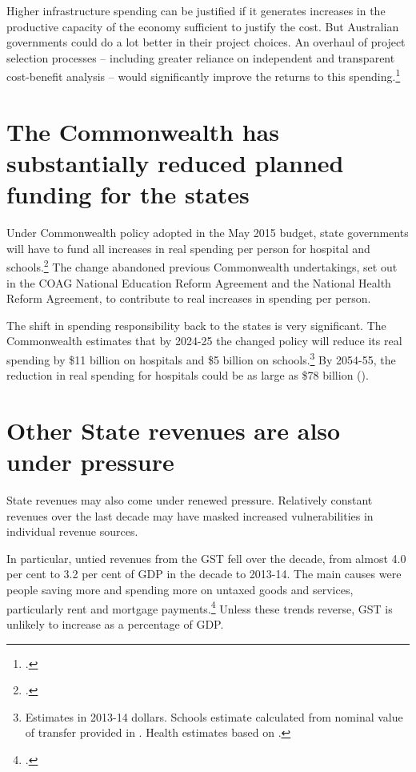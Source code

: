 \documentclass[twoside,english]{grattanBudgetRepairb5portrait}
\begin{document}
Higher infrastructure spending can be justified if it generates increases in the productive capacity of the economy sufficient to justify the cost. But Australian governments could do a lot better in their project choices. An overhaul of project selection processes – including greater reliance on independent and transparent cost-benefit analysis – would significantly improve the returns to this spending.\footcite{ProductivityCommission2013PublicInfrastructure} 

\section{The Commonwealth has substantially reduced planned funding for the states\label{sec:FISCAL-4-3}}
Under Commonwealth policy adopted in the May 2015 budget, state governments will have to fund all increases in real spending per person for hospital and schools.\footcite[][BP~No.~2, p.~126]{Treasury2014-Budget-Papers-2014-15}  The change abandoned previous Commonwealth undertakings, set out in the COAG National Education Reform Agreement and the National Health Reform Agreement, to contribute to real increases in spending per person.

The shift in spending responsibility back to the states is very significant. The Commonwealth estimates that by 2024-25 the changed policy will reduce its real spending by \$11 billion on hospitals and \$5 billion on schools.\footnote{Estimates in 2013-14 dollars. Schools estimate calculated from nominal value of transfer provided in \textcite[][Overview, p.~7]{Treasury2014-Budget-Papers-2014-15}. Health estimates based on \textcite{Hockey2015IGR}.}  By 2054-55, the reduction in real spending for hospitals could be as large as \$78 billion ().  

\section{Other State revenues are also under pressure\label{sec:FISCAL-4-4}}
State revenues may also come under renewed pressure. Relatively constant revenues over the last decade may have masked increased vulnerabilities in individual revenue sources.

In particular, untied revenues from the GST fell over the decade, from almost 4.0 per cent to 3.2 per cent of GDP in the decade to 2013-14. The main causes were people saving more and spending more on untaxed goods and services, particularly rent and mortgage payments.\footcite[][34]{DaleyWoodWeidmannEtAl2014}  Unless these trends reverse, GST is unlikely to increase as a percentage of GDP.
\end{document}
